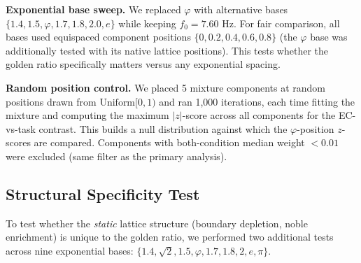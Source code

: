 \documentclass[11pt,a4paper]{article}
\newcommand{\phisym}{\varphi}
\newcommand{\fzero}{f_0}
\begin{document}
\textbf{Exponential base sweep.} We replaced $\phisym$ with alternative bases $\{1.4, 1.5, \phisym, 1.7, 1.8, 2.0, e\}$ while keeping $\fzero = 7.60$ Hz. For fair comparison, all bases used equispaced component positions $\{0, 0.2, 0.4, 0.6, 0.8\}$ (the $\phisym$ base was additionally tested with its native lattice positions). This tests whether the golden ratio specifically matters versus any exponential spacing.

\textbf{Random position control.} We placed 5 mixture components at random positions drawn from $\text{Uniform}[0, 1)$ and ran 1,000 iterations, each time fitting the mixture and computing the maximum $|z|$-score across all components for the EC-vs-task contrast. This builds a null distribution against which the $\phisym$-position $z$-scores are compared. Components with both-condition median weight $< 0.01$ were excluded (same filter as the primary analysis).

\subsection{Structural Specificity Test}
\label{sec:structural}

To test whether the \emph{static} lattice structure (boundary depletion, noble enrichment) is unique to the golden ratio, we performed two additional tests across nine exponential bases: $\{1.4, \sqrt{2}, 1.5, \phisym, 1.7, 1.8, 2, e, \pi\}$.
\end{document}
